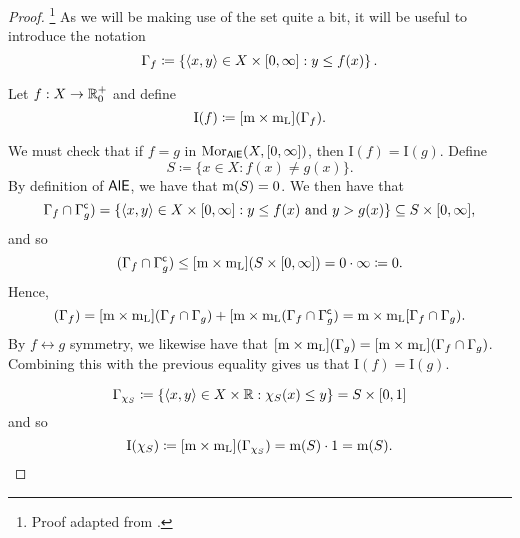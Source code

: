 \begin{thm}[Integral]
\begin{rmk}
\end{rmk}
\begin{proof}\footnote{Proof adapted from \cite[pg.~377]{Pugh}.}
As we will be making use of the set quite a bit, it will be useful to introduce the notation
\begin{equation}
\Gamma _f\coloneqq \left\{ \langle x,y\rangle\in X\times [0,\infty ]:y\leq f(x)\right\} .
\end{equation}

Let $f:X\rightarrow \mathbb{R} _0^+$ and define
\begin{equation}
\mathrm{I}(f)\coloneqq [\mathrm{m} \times \mathrm{m} _{\mathrm{L}}](\Gamma _f) .
\end{equation}

We must check that if $f=g$ in $\operatorname{Mor} _{\mathsf{AlE}}(X,[0,\infty ])$, then $\mathrm{I}(f)=\mathrm{I}(g)$.  Define
\begin{equation}
S\coloneqq \{ x\in X:f(x)\neq g(x)\} .
\end{equation}
By definition of $\mathsf{AlE}$, we have that $\mathrm{m} (S)=0$.  We then have that
\begin{equation}
\Gamma _f\cap \Gamma _g^{\mathsf{c}})=\{ \langle x,y\rangle\in X\times [0,\infty ]:y\leq f(x)\text{ and }y>g(x)\} \subseteq S\times [0,\infty ],
\end{equation}
and so
\begin{equation}
[\meas \times \meas _{\mathrm{L}}](\Gamma _f\cap \Gamma _g^{\comp})\leq [\meas \times \meas _{\mathrm{L}}](S\times [0,\infty ])=0\cdot \infty \coloneqq 0.
\end{equation}
Hence,
\begin{equation}
[\meas \times \meas _{\mathrm{L}}](\Gamma _f)=[\meas \times \meas _{\mathrm{L}}](\Gamma _f\cap \Gamma _g)+[\meas \times \meas _{\mathrm{L}}(\Gamma _f\cap \Gamma _g^{\comp})=\meas \times \meas _{\mathrm{L}}[\Gamma _f\cap \Gamma _g).
\end{equation}
By $f\leftrightarrow g$ symmetry, we likewise have that $[\mathrm{m} \times \mathrm{m} _{\mathrm{L}}](\Gamma _g)=[\mathrm{m} \times \mathrm{m} _{\mathrm{L}}](\Gamma _f\cap \Gamma _g)$.  Combining this with the previous equality gives us that $\mathrm{I}(f)=\mathrm{I}(g)$.

\begin{equation}
\Gamma _{\chi _S}\coloneqq \left\{ \langle x,y\rangle\in X\times \mathbb{R} :\chi _S(x)\leq y\right\} =S\times [0,1]
\end{equation}
and so
\begin{equation}
\mathrm{I}(\chi _S)\coloneqq [\mathrm{m} \times \mathrm{m} _{\mathrm{L}}](\Gamma _{\chi _S})=\mathrm{m} (S)\cdot 1=\mathrm{m} (S).
\end{equation}


\end{proof}
\end{thm}
